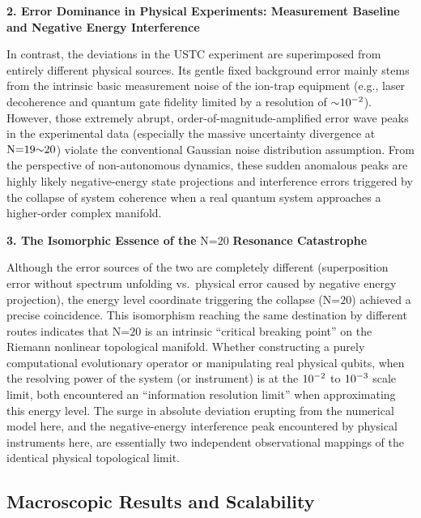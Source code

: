 \documentclass[fleqn,10pt]{wlscirep}
\begin{document}
\textbf{2. Error Dominance in Physical Experiments: Measurement Baseline
and Negative Energy Interference}

In contrast, the deviations in the USTC experiment are superimposed from
entirely different physical sources. Its gentle fixed background error
mainly stems from the intrinsic basic measurement noise of the ion-trap
equipment (e.g., laser decoherence and quantum gate fidelity limited by
a resolution of \(\text{\ensuremath{\sim}}\text{10}^{\text{\ensuremath{-}2}}\)). However, those
extremely abrupt, order-of-magnitude-amplified error wave peaks in the
experimental data (especially the massive uncertainty divergence at
\(\text{N}\text{=19\ensuremath{\sim}20}\)) violate the conventional Gaussian noise
distribution assumption. From the perspective of non-autonomous
dynamics, these sudden anomalous peaks are highly likely negative-energy
state projections and interference errors triggered by the collapse of
system coherence when a real quantum system approaches a higher-order
complex manifold.

\textbf{3. The Isomorphic Essence of the} \(\text{N}\text{=20}\)
\textbf{Resonance Catastrophe}

Although the error sources of the two are completely different
(superposition error without spectrum unfolding vs.~physical error
caused by negative energy projection), the energy level coordinate
triggering the collapse (\(\text{N}\text{=20}\)) achieved a precise
coincidence. This isomorphism reaching the same destination by different
routes indicates that \(\text{N}\text{=20}\) is an intrinsic ``critical
breaking point'' on the Riemann nonlinear topological manifold. Whether
constructing a purely computational evolutionary operator or
manipulating real physical qubits, when the resolving power of the
system (or instrument) is at the \(\text{10}^{\text{\ensuremath{-}2}}\) to
\(\text{10}^{\text{\ensuremath{-}3}}\) scale limit, both encountered an ``information
resolution limit'' when approximating this energy level. The surge in
absolute deviation erupting from the numerical model here, and the
negative-energy interference peak encountered by physical instruments
here, are essentially two independent observational mappings of the
identical physical topological limit.

\subsection*{Macroscopic Results and Scalability}
\end{document}

